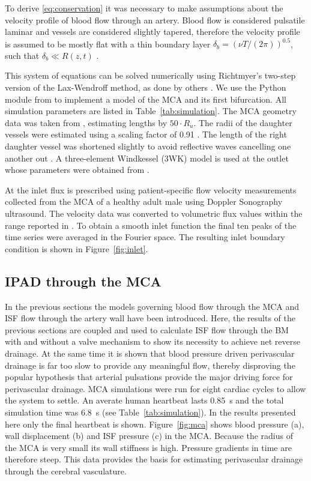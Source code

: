 \documentclass{frontiersFPHY} %
\begin{document}
To derive \eqref{eq:conservation} it was necessary to make assumptions about the velocity profile of blood flow through an artery. Blood flow is considered pulsatile laminar and vessels are considered slightly tapered, therefore the velocity profile is assumed to be mostly flat with a thin boundary layer $\delta_b = (\nu T/(2\pi))^{0.5}$, such that $\delta_b \ll R(z,t)$ \cite{Olufsen2000}.

This system of equations can be solved numerically using Richtmyer's two-step version of the Lax-Wendroff method, as done by others \cite{Olufsen2000,LeVeque1992,Kolachalama2007}. We use the Python module from \cite{Diem2016a} to implement a model of the MCA and its first bifurcation. All simulation parameters are listed in Table~\ref{tab:simulation}. The MCA geometry data was taken from \cite{Cousins2014}, estimating lengths by $50 \cdot R_u$. The radii of the daughter vessels were estimated using a scaling factor of 0.91 \cite{Cousins2014}. The length of the right daughter vessel was shortened slightly to avoid reflective waves cancelling one another out \cite{Kolachalama2007}. A three-element Windkessel (3WK) model is used at the outlet whose parameters were obtained from \cite{Olufsen2002}.

At the inlet flux is prescribed using patient-specific flow velocity measurements collected from the MCA of a healthy adult male using Doppler Sonography ultrasound. The velocity data was converted to volumetric flux values within the range reported in \cite{Olufsen2002}. To obtain a smooth inlet function the final ten peaks of the time series were averaged in the Fourier space. The resulting inlet boundary condition is shown in Figure~\ref{fig:inlet}.

\subsection{IPAD through the MCA}

In the previous sections the models governing blood flow through the MCA and ISF flow through the artery wall have been introduced. Here, the results of the previous sections are coupled and used to calculate ISF flow through the BM with and without a valve mechanism to show its necessity to achieve net reverse drainage. At the same time it is shown that blood pressure driven perivascular drainage is far too slow to provide any meaningful flow, thereby disproving the popular hypothesis that arterial pulsations provide the major driving force for perivascular drainage. MCA simulations were run for eight cardiac cycles to allow the system to settle. An averate human heartbeat lasts \SI{0.85}{\second} and the total simulation time was \SI{6.8}{\second} (see Table~\ref{tab:simulation}). In the results presented here only the final heartbeat is shown. Figure~\ref{fig:mca} shows blood pressure (a), wall displacement (b) and ISF pressure (c) in the MCA. Because the radius of the MCA is very small its wall stiffness is high. Pressure gradients in time are therefore steep. This data provides the basis for estimating perivascular drainage through the cerebral vasculature.
\end{document}
